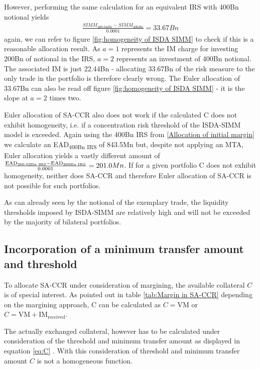 \documentclass[../Thesis_AHoecherl.tex]{subfiles}
\begin{document}
    However, performing the same calculation for an equivalent IRS with 400Bn notional yields
    \begin{align*}
        \frac{SIMM_{400.04Bn} - SIMM_{400Bn}}{0.0001} = 33.67Bn
    \end{align*}
    again, we can refer to figure \ref{fig:homogeneity of ISDA SIMM} to check if this is a reasonable allocation result. As $a=1$ represents the IM charge for investing 200Bn of notional in the IRS, $a=2$ represents an investment of 400Bn notional. The associated IM is just 22.44Bn - allocating 33.67Bn of the risk measure to the only trade in the portfolio is therefore clearly wrong. The Euler allocation of 33.67Bn can also be read off figure \ref{fig:homogeneity of ISDA SIMM} - it is the slope at $a=2$ times two.

    Euler allocation of SA-CCR also does not work if the calculated C does not exhibit homogeneity, i.e. if a concentration risk threshold of the ISDA-SIMM model is exceeded. Again using the 400Bn IRS from \ref{Allocation of initial margin} we calculate an EAD\textsubscript{400Bn IRS} of 843.5Mn but, despite not applying an MTA, Euler allocation yields a vastly different amount of $ \frac{\text{EAD\textsubscript{200.02Bn IRS}}-\text{EAD\textsubscript{200Bn IRS}}}{0.0001} = 201.0Mn $. If for a given portfolio C does not exhibit homogeneity, neither does SA-CCR and therefore Euler allocation of SA-CCR is not possible for such portfolios. 
    
    As can already seen by the notional of the exemplary trade, the liquidity thresholds imposed by ISDA-SIMM are relatively high and will not be exceeded by the majority of bilateral portfolios.
    

    \subsection{Incorporation of a minimum transfer amount and threshold}

    To allocate \gls{SA-CCR} under consideration of margining, the available collateral $C$ is of special interest. As pointed out in table \ref{tab:Margin in SA-CCR} depending on the margining approach, C can be calculated as $C = \text{VM}$ or $C = \text{VM} + \text{IM}_{\text{received}}$.
    
    The actually exchanged collateral, however has to be calculated under consideration of the threshold and minimum transfer amount as displayed in equation \ref{eq:C} . With this consideration of threshold and minimum transfer amount $C$ is not a homogeneous function. 
\end{document}
